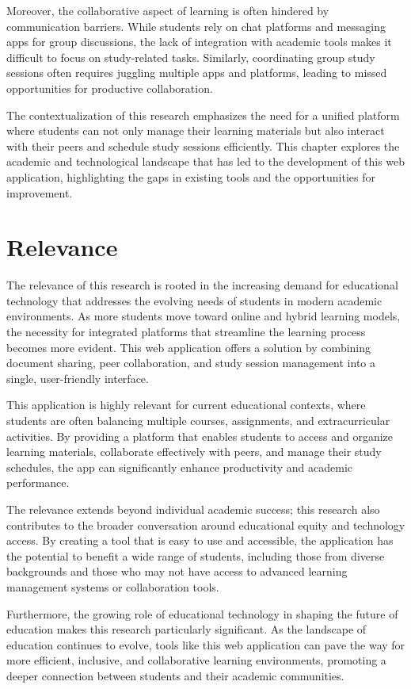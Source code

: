 Moreover, the collaborative aspect of learning is often hindered by communication barriers. While students rely on chat platforms and messaging apps for group discussions, the lack of integration with academic tools makes it difficult to focus on study-related tasks. Similarly, coordinating group study sessions often requires juggling multiple apps and platforms, leading to missed opportunities for productive collaboration.

The contextualization of this research emphasizes the need for a unified platform where students can not only manage their learning materials but also interact with their peers and schedule study sessions efficiently. This chapter explores the academic and technological landscape that has led to the development of this web application, highlighting the gaps in existing tools and the opportunities for improvement.

\section{Relevance}

The relevance of this research is rooted in the increasing demand for educational technology that addresses the evolving needs of students in modern academic environments. As more students move toward online and hybrid learning models, the necessity for integrated platforms that streamline the learning process becomes more evident. This web application offers a solution by combining document sharing, peer collaboration, and study session management into a single, user-friendly interface.

This application is highly relevant for current educational contexts, where students are often balancing multiple courses, assignments, and extracurricular activities. By providing a platform that enables students to access and organize learning materials, collaborate effectively with peers, and manage their study schedules, the app can significantly enhance productivity and academic performance.

The relevance extends beyond individual academic success; this research also contributes to the broader conversation around educational equity and technology access. By creating a tool that is easy to use and accessible, the application has the potential to benefit a wide range of students, including those from diverse backgrounds and those who may not have access to advanced learning management systems or collaboration tools.

Furthermore, the growing role of educational technology in shaping the future of education makes this research particularly significant. As the landscape of education continues to evolve, tools like this web application can pave the way for more efficient, inclusive, and collaborative learning environments, promoting a deeper connection between students and their academic communities.
